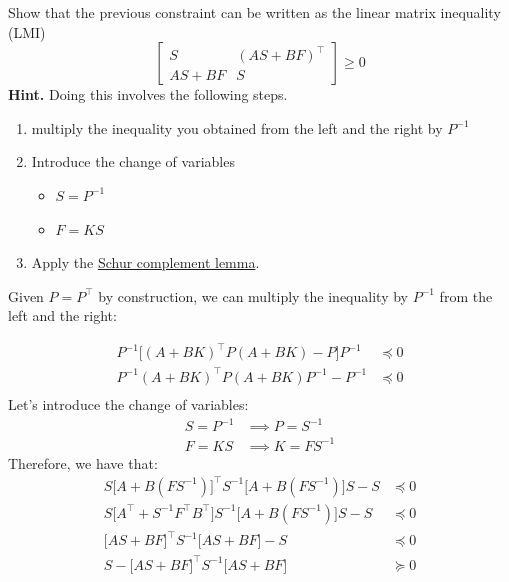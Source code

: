 \documentclass[]{article}
\begin{document}
\begin{assignment}\label{sess3:c1}
	Show that the previous constraint can be written as the linear matrix inequality (LMI)
	\[ 
		\begin{bmatrix}
			S & (AS + BF)^\top \\ 
			AS + BF & S
		\end{bmatrix} \geq 0
	\]
	\textbf{Hint.} Doing this involves the following steps. 
	\begin{enumerate}
		\item multiply the inequality you obtained from the left and the right by $P^{-1}$
		\item Introduce the change of variables
			\begin{itemize}
			\item $S=P^{-1}$
			\item $F=KS$
			\end{itemize}
		\item Apply the \href{https://inst.eecs.berkeley.edu/~ee127/sp21/livebook/thm_schur_compl.html}{Schur complement lemma}.
	\end{enumerate}
\end{assignment}
\begin{flushleft}
	Given $P = P^\top$ by construction, we can multiply the inequality by $P^{-1}$ from the left and the right:
\end{flushleft}
\begin{equation}
	\begin{aligned}
		P^{-1} \Big[ (A + BK)^\top P (A + BK) - P \Big] P^{-1} &\preceq 0 \\  
		P^{-1} (A + BK)^\top P (A + BK) P^{-1} - P^{-1} &\preceq 0 \\
	\end{aligned}
\end{equation}
Let's introduce the change of variables:
\begin{equation}
	\begin{aligned}
		S = P^{-1} &\implies P = S^{-1}\\
		F = KS &\implies K = FS^{-1}
	\end{aligned}
\end{equation}
Therefore, we have that:
\begin{equation}
	\begin{aligned}
		S \Big[A + B ( F S^{-1}) \Big]^\top S^{-1} \Big[A + B ( F S^{-1} ) \Big] S - S &\preceq 0 \\
		S \Big[A^\top + S^{-1} F^\top B^\top \Big] S^{-1} \Big[A + B ( F S^{-1} ) \Big] S - S &\preceq 0 \\
		\Big[A S + B F \Big]^\top S^{-1} \Big[A S + B F \Big] - S &\preceq 0 \\
		S - \Big[A S + B F \Big]^\top S^{-1} \Big[A S + B F \Big] &\succeq 0
	\end{aligned}
\end{equation}
\end{document}
